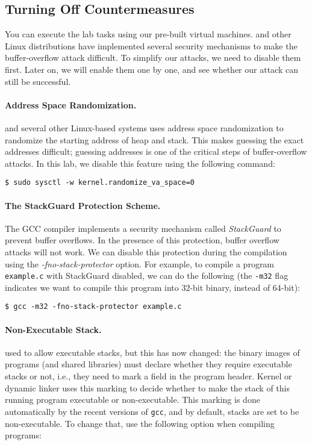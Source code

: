 \subsection{Turning Off Countermeasures}

You can execute the lab tasks using our pre-built \ubuntu virtual machines. 
\ubuntu and other Linux distributions have implemented several
security mechanisms to make the buffer-overflow attack difficult. 
To simplify our attacks, we need to disable them first. Later on, we will enable them one by
one, and see whether our attack can still be successful.


\paragraph{Address Space Randomization.}
\ubuntu and several other Linux-based systems uses address space
randomization to randomize the starting address of heap and
stack. This makes guessing the exact addresses difficult; guessing
addresses is one of the critical steps of buffer-overflow attacks.  In
this lab, we disable this feature using the following command:

\begin{lstlisting}
$ sudo sysctl -w kernel.randomize_va_space=0
\end{lstlisting}


\paragraph{The StackGuard Protection Scheme.}
The GCC compiler implements a security mechanism called
\textit{StackGuard} to prevent buffer overflows. In the presence of this
protection, buffer overflow attacks will not work. We can disable this
protection during the compilation using the 
\emph{-fno-stack-protector} option. For example, to compile a program
\texttt{example.c} with StackGuard disabled, we can do the following (the
\texttt{-m32} flag indicates we want to compile this program into
32-bit binary, instead of 64-bit):


\begin{lstlisting}
$ gcc -m32 -fno-stack-protector example.c
\end{lstlisting}


\paragraph{Non-Executable Stack.} \ubuntu used to allow executable stacks, but
this has now changed: the binary images of programs (and shared libraries) 
must declare whether they require executable stacks or not, i.e., they need to 
mark a field in the program header. Kernel or dynamic linker uses this marking
to decide whether to make the stack of this running program executable or 
non-executable. This marking is done automatically by the 
recent versions of {\tt gcc}, and by default, stacks are set to 
be non-executable.
To change that, use the following option when compiling programs:


